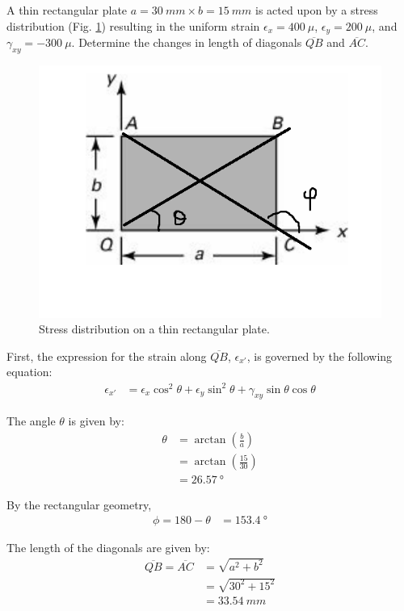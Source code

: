 \section{}
A thin rectangular plate $a = \qty{30}{mm} \times b = \qty{15}{mm}$ is acted upon by a stress distribution 
(Fig. \ref{fig:Q1}) resulting in the uniform strain $\epsilon_x = \qty{400}{\mu}$, $\epsilon_y = \qty{200}{\mu}$,
and $\gamma_{xy} = \qty{-300}{\mu}$. Determine the changes in length of diagonals $\overline{QB}$ and $\overline{AC}$.
\begin{figure}[h]
    \centering
    \includegraphics[width=0.5\linewidth]{Questions/Figures/Q1ProblemDiagram.png}
    \caption{Stress distribution on a thin rectangular plate.}
    \label{fig:Q1}
\end{figure}


First, the expression for the strain along $\overline{QB}$, $\epsilon_{x'}$, is governed by the following equation:
\begin{align}
    \epsilon_{x'} &= \epsilon_x\cos^2\theta + \epsilon_y\sin^2\theta + \gamma_{xy}\sin\theta\cos\theta \label{eq:Q1Strain}
\end{align}

The angle $\theta$ is given by:
\begin{align*}
    \theta &= \arctan\left(\frac{b}{a}\right) \\
    &= \arctan\left(\frac{15}{30}\right) \\
    &= \qty{26.57}{\degree}
\end{align*}

By the rectangular geometry,
\begin{align*}
    \phi = 180 - \theta &= \qty{153.4}{\degree}
\end{align*}

The length of the diagonals are given by:
\begin{align*}
    \overline{QB} = \overline{AC} &= \sqrt{a^2 + b^2} \\
    &= \sqrt{30^2 + 15^2} \\
    &= {\qty{33.54}{mm}}
\end{align*}

